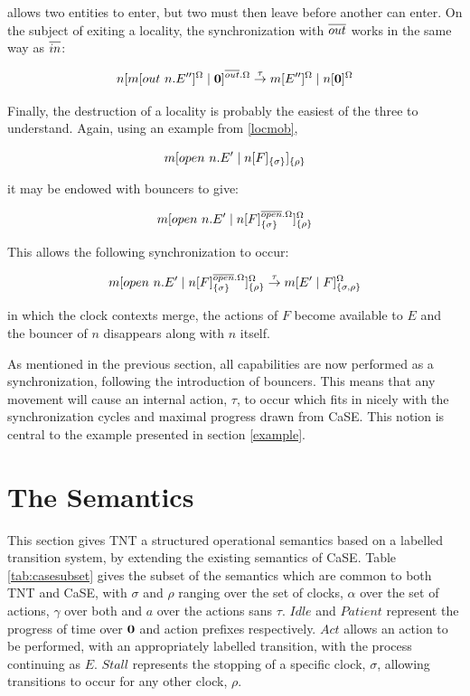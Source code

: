 \noindent allows two entities to enter, but two must then leave before
another can enter.  On the subject of exiting a locality, the
synchronization with $\overline{out}$ works in the same way as $\overline{in}$:

\begin{equation}
{n}[ {m}[ out\ n.E^{\prime \prime} ]^{\Omega} \;|\; \textbf{0} ]^{\overline{out}.\Omega}
 \stackrel{\tau}{\rightarrow}
{m}[ E^{\prime \prime} ]^{\Omega} \;|\; {n}[ \textbf{0} ]^{\Omega}
\end{equation}

Finally, the destruction of a locality is probably the easiest of the
three to understand.  Again, using an example from \ref{locmob},

\begin{equation}
{m}[ open\ n.E^\prime\;|\;{n}[ F ]_{\{\sigma\}} ]_{\{\rho\}}
\end{equation}

\noindent it may be endowed with bouncers to give:

\begin{equation}
{m}[ open\ n.E^\prime \;|\; {n}[ F ]^{\overline{open}.\Omega}_{\{\sigma\}} ]^{\Omega}_{\{\rho\}}
\end{equation}

\noindent This allows the following synchronization to occur:

\begin{equation}
{m}[ open\ n.E^\prime \;|\; {n}[ F ]^{\overline{open}.\Omega}_{\{\sigma\}} ]^{\Omega}_{\{\rho\}}
\stackrel{\tau}{\rightarrow}
{m}[ E^\prime \;|\; {F} ]^{\Omega}_{\{\sigma, \rho\}}
\end{equation}

\noindent in which the clock contexts merge, the actions of $F$ become
available to $E$ and the bouncer of $n$ disappears along with $n$
itself.

As mentioned in the previous section, all capabilities are now performed
as a synchronization, following the introduction of bouncers.  This
means that any movement will cause an internal action, $\tau$, to occur
which fits in nicely with the synchronization cycles and maximal
progress drawn from CaSE.  This notion is central to the example
presented in section \ref{example}.

\section{The Semantics}
\label{tntsemantics}

This section gives TNT a structured operational semantics based on a
labelled transition system, by extending the existing semantics of CaSE.
Table \ref{tab:casesubset} gives the subset of the semantics which are
common to both TNT and CaSE, with $\sigma$ and $\rho$ ranging over the
set of clocks, $\alpha$ over the set of actions, $\gamma$ over both
and $a$ over the actions sans $\tau$. $Idle$ and $Patient$ represent
the progress of time over $\textbf{0}$ and action prefixes respectively.
$Act$ allows an action to be performed, with an appropriately labelled
transition, with the process continuing as $E$.  $Stall$ represents
the stopping of a specific clock, $\sigma$, allowing transitions to
occur for any other clock, $\rho$.

